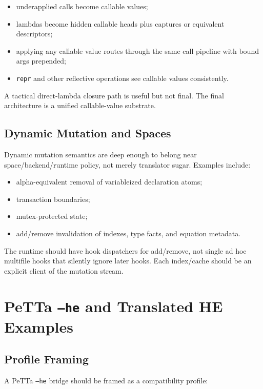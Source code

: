 \documentclass[11pt]{article}
\newcommand{\PeTTa}{PeTTa}
\begin{document}
\begin{itemize}[leftmargin=*]
  \item underapplied calls become callable values;
  \item lambdas become hidden callable heads plus captures or equivalent descriptors;
  \item applying any callable value routes through the same call pipeline with bound args prepended;
  \item \texttt{repr} and other reflective operations see callable values consistently.
\end{itemize}

A tactical direct-lambda closure path is useful but not final.  The final architecture is a unified callable-value substrate.

\subsection{Dynamic Mutation and Spaces}

Dynamic mutation semantics are deep enough to belong near space/backend/runtime policy, not merely translator sugar.  Examples include:

\begin{itemize}[leftmargin=*]
  \item alpha-equivalent removal of variableized declaration atoms;
  \item transaction boundaries;
  \item mutex-protected state;
  \item add/remove invalidation of indexes, type facts, and equation metadata.
\end{itemize}

The runtime should have hook dispatchers for add/remove, not single ad hoc multifile hooks that silently ignore later hooks.  Each index/cache should be an explicit client of the mutation stream.

\section{PeTTa \texttt{--he} and Translated HE Examples}\label{sec:petta-he}

\subsection{Profile Framing}

A \PeTTa{} \texttt{--he} bridge should be framed as a compatibility profile:
\end{document}
